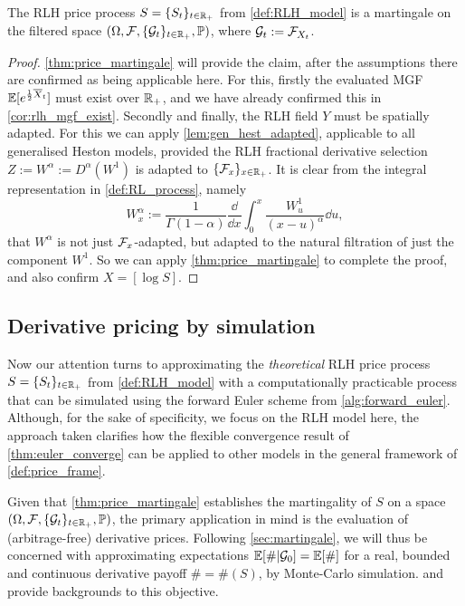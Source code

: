 \begin{corollary}\label{cor:RLH_martingality}
    The RLH price process $S=\{S_t\}_{t\in\mathbb{R}_+}$ from \autoref{def:RLH_model} is a martingale on the filtered space $(\Omega,\mathcal{F},\{\mathcal{G}_t\}_{t\in\mathbb{R}_+},\mathbb{P})$, where $\mathcal{G}_t:=\mathcal{F}_{X_t}$.
\end{corollary}
\begin{proof}
    \autoref{thm:price_martingale} will provide the claim, after the assumptions there are confirmed as being applicable here. For this, firstly the evaluated MGF $\mathbb{E}[e^{\frac12{\overline{X}}_t}]$ must exist over $\mathbb{R}_+$, and we have already confirmed this in \autoref{cor:rlh_mgf_exist}. Secondly and finally, the RLH field $Y$ must be spatially adapted. For this we can apply \autoref{lem:gen_hest_adapted}, applicable to all generalised Heston models, provided the RLH fractional derivative selection $Z:=W^\alpha:=D^\alpha(W^1)$ is adapted to $\{\mathcal{F}_x\}_{x\in\mathbb{R}_+}$. It is clear from the integral representation in \autoref{def:RL_process}, namely~
    \begin{equation}
        W^\alpha_x := \frac{1}{\Gamma(1-\alpha)}\frac{\dd}{\dd x}\int_0^x\frac{W^1_u}{(x-u)^\alpha}\dd u,
    \end{equation}
    that $W^\alpha$ is not just $\mathcal{F}_x$-adapted, but adapted to the natural filtration of just the component $W^1$. So we can apply \autoref{thm:price_martingale} to complete the proof, and also confirm $X=[\log S]$.
\end{proof}

\subsection{Derivative pricing by simulation}\label{sec:vol_surfaces}

Now our attention turns to approximating the \emph{theoretical} RLH price process $S=\{S_t\}_{t\in\mathbb{R}_+}$ from \autoref{def:RLH_model} with a computationally practicable process that can be simulated using the forward Euler scheme from \autoref{alg:forward_euler}. Although, for the sake of specificity, we focus on the RLH model here, the approach taken clarifies how the flexible convergence result of \autoref{thm:euler_converge} can be applied to other models in the general framework of \autoref{def:price_frame}.

Given that \autoref{thm:price_martingale} establishes the martingality of $S$ on a space $(\Omega, \mathcal{F},\{\mathcal{G}_t\}_{t\in\mathbb{R}_+},\mathbb{P})$, the primary application in mind is the evaluation of (arbitrage-free) derivative prices. Following \autoref{sec:martingale}, we will thus be concerned with approximating expectations $\mathbb{E}[\#|\mathcal{G}_0]=\mathbb{E}[\#]$ for a real, bounded and continuous derivative payoff $\#=\#(S)$, by Monte-Carlo simulation. \cite{glasserman_2003} and \cite{asmussen_2007} provide backgrounds to this objective.

